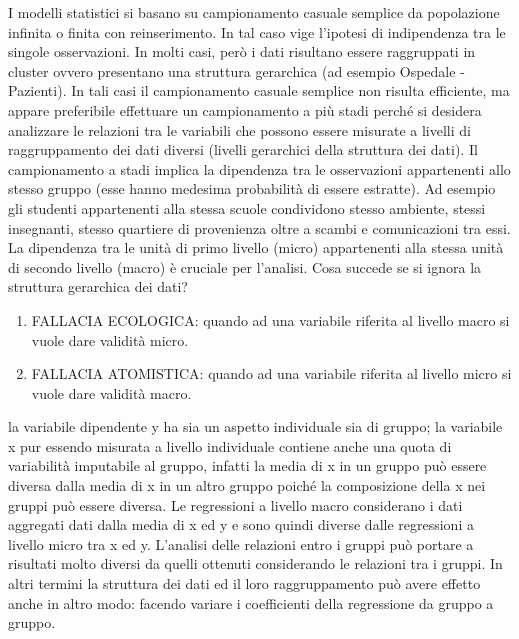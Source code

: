 \documentclass[a4page, 11pt]{article} %
\begin{document}
I modelli statistici si basano su campionamento casuale semplice da popolazione infinita o finita con reinserimento. In tal caso vige l’ipotesi di indipendenza tra le singole osservazioni.
\newline 
In molti casi, però i dati risultano essere raggruppati in cluster ovvero presentano una struttura gerarchica (ad esempio Ospedale - Pazienti). In tali casi il campionamento casuale semplice non risulta efficiente, ma appare preferibile effettuare un campionamento a più stadi perché si desidera analizzare le relazioni tra le variabili che possono essere misurate a livelli di raggruppamento dei dati diversi (livelli gerarchici della struttura dei dati).
\newline
Il campionamento a stadi implica la dipendenza tra le osservazioni appartenenti allo stesso gruppo (esse hanno medesima probabilità di essere estratte).
\newline
Ad esempio gli studenti appartenenti alla stessa scuole condividono stesso ambiente, stessi insegnanti, stesso quartiere di provenienza oltre a scambi e comunicazioni tra essi.
\newline
La dipendenza tra le unità di primo livello (micro) appartenenti alla stessa unità di secondo livello (macro) è cruciale per l’analisi.
\newline
Cosa succede se si ignora la struttura gerarchica dei dati?
\begin{enumerate}[noitemsep]
\item FALLACIA ECOLOGICA: quando ad una variabile riferita al livello macro si vuole dare validità micro.
\item FALLACIA ATOMISTICA: quando ad una variabile riferita al livello micro si vuole dare validità macro.
\end{enumerate}
la variabile dipendente y ha sia un aspetto individuale sia di gruppo; la variabile x pur essendo misurata a livello individuale contiene anche una quota di variabilità imputabile al gruppo, infatti la media di x in un gruppo può essere diversa dalla media di x in un altro gruppo poiché la composizione della x nei gruppi può essere diversa.
\newline
Le regressioni a livello macro considerano i dati aggregati dati dalla media di x ed y e sono quindi diverse dalle regressioni a livello micro tra x ed y.
\newline
L’analisi delle relazioni entro i gruppi può portare a risultati molto diversi da quelli ottenuti considerando le relazioni tra i gruppi.
In altri termini la struttura dei dati ed il loro raggruppamento può avere effetto anche in altro modo: facendo variare i coefficienti della regressione da gruppo a gruppo.
\end{document}
